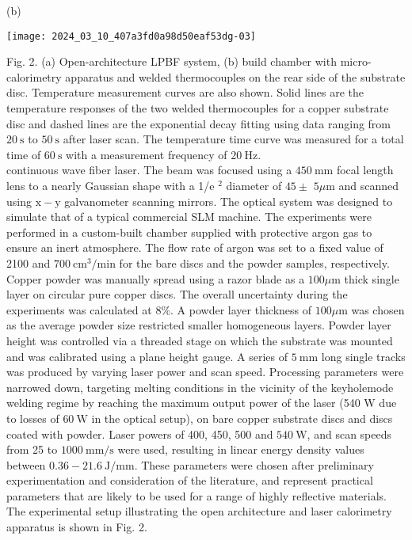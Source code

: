\documentclass[10pt]{article}
\begin{document}
(b)

\begin{center}
\texttt{[image: 2024\_03\_10\_407a3fd0a98d50eaf53dg-03]}
\end{center}

Fig. 2. (a) Open-architecture LPBF system, (b) build chamber with micro-calorimetry apparatus and welded thermocouples on the rear side of the substrate disc. Temperature measurement curves are also shown. Solid lines are the temperature responses of the two welded thermocouples for a copper substrate disc and dashed lines are the exponential decay fitting using data ranging from $20 \mathrm{~s}$ to $50 \mathrm{~s}$ after laser scan. The temperature time curve was measured for a total time of $60 \mathrm{~s}$ with a measurement frequency of $20 \mathrm{~Hz}$.\\
continuous wave fiber laser. The beam was focused using a $450 \mathrm{~mm}$ focal length lens to a nearly Gaussian shape with a 1/e ${ }^{2}$ diameter of $45 \pm$ $5 \mu \mathrm{m}$ and scanned using $\mathrm{x}-\mathrm{y}$ galvanometer scanning mirrors. The optical system was designed to simulate that of a typical commercial SLM machine. The experiments were performed in a custom-built chamber supplied with protective argon gas to ensure an inert atmosphere. The flow rate of argon was set to a fixed value of 2100 and $700 \mathrm{~cm}^{3} / \mathrm{min}$ for the bare discs and the powder samples, respectively. Copper powder was manually spread using a razor blade as a $100 \mu \mathrm{m}$ thick single layer on circular pure copper discs. The overall uncertainty during the experiments was calculated at $8 \%$. A powder layer thickness of $100 \mu \mathrm{m}$ was chosen as the average powder size restricted smaller homogeneous layers. Powder layer height was controlled via a threaded stage on which the substrate was mounted and was calibrated using a plane height gauge. A series of $5 \mathrm{~mm}$ long single tracks was produced by varying laser power and scan speed. Processing parameters were narrowed down, targeting melting conditions in the vicinity of the keyholemode welding regime by reaching the maximum output power of the laser (540 W due to losses of $60 \mathrm{~W}$ in the optical setup), on bare copper substrate discs and discs coated with powder. Laser powers of 400, 450, 500 and $540 \mathrm{~W}$, and scan speeds from 25 to $1000 \mathrm{~mm} / \mathrm{s}$ were used, resulting in linear energy density values between $0.36-21.6 \mathrm{~J} / \mathrm{mm}$. These parameters were chosen after preliminary experimentation and consideration of the literature, and represent practical parameters that are likely to be used for a range of highly reflective materials. The experimental setup illustrating the open architecture and laser calorimetry apparatus is shown in Fig. 2.
\end{document}
